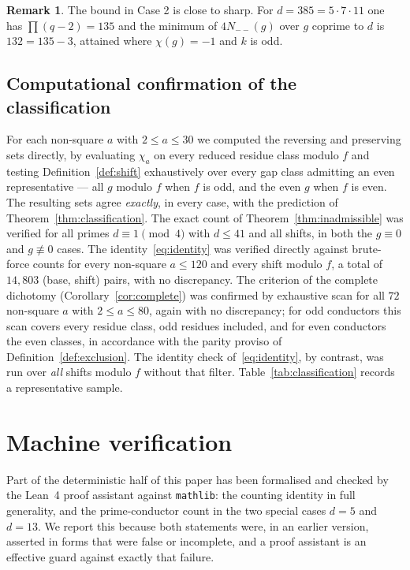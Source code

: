 \documentclass[11pt,reqno]{amsart}
\theoremstyle{plain}
\theoremstyle{definition}
\newtheorem{remark}[theorem]{Remark}
\begin{document}
\begin{remark}
The bound in Case 2 is close to sharp. For $d = 385 = 5 \cdot 7 \cdot 11$ one
has $\prod (q-2) = 135$ and the minimum of $4N_{--}(g)$ over $g$ coprime to
$d$ is $132 = 135 - 3$, attained where $\chi(g) = -1$ and $k$ is odd.
\end{remark}

\subsection*{Computational confirmation of the classification}
For each non-square $a$ with $2 \le a \le 30$ we computed the reversing and
preserving sets directly, by evaluating $\chi_a$ on every reduced residue
class modulo $f$ and testing Definition~\ref{def:shift} exhaustively over
every gap class admitting an even representative --- all $g$ modulo $f$ when
$f$ is odd, and the even $g$ when $f$ is even. The resulting sets agree \emph{exactly}, in every case,
with the prediction of Theorem~\ref{thm:classification}. The exact count of
Theorem~\ref{thm:inadmissible} was verified for all primes
$d \equiv 1 \pmod 4$ with $d \le 41$ and all shifts, in both the $g \equiv 0$
and $g \not\equiv 0$ cases. The identity~\eqref{eq:identity} was verified
directly against brute-force counts for every non-square $a \le 120$ and every
shift modulo $f$, a total of $14{,}803$ (base, shift) pairs, with no
discrepancy. The criterion of the complete dichotomy
(Corollary~\ref{cor:complete}) was confirmed by exhaustive scan for all $72$
non-square $a$ with $2 \le a \le 80$, again with no discrepancy; for odd
conductors this scan covers every residue class, odd residues included, and
for even conductors the even classes, in accordance with the parity proviso of
Definition~\ref{def:exclusion}. The identity check of~\eqref{eq:identity}, by
contrast, was run over \emph{all} shifts modulo $f$ without that filter.
Table~\ref{tab:classification} records a representative sample.

\section{Machine verification}
\label{sec:formal}

Part of the deterministic half of this paper has been formalised and checked
by the Lean~4 proof assistant against \texttt{mathlib}: the counting identity
in full generality, and the prime-conductor count in the two special cases
$d = 5$ and $d = 13$. We report this because both statements were, in an earlier
version, asserted in forms that were false or incomplete, and a proof
assistant is an effective guard against exactly that failure.
\end{document}
